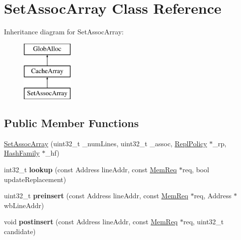 \hypertarget{classSetAssocArray}{\section{Set\-Assoc\-Array Class Reference}
\label{classSetAssocArray}
}
Inheritance diagram for Set\-Assoc\-Array\-:\begin{figure}[H]
\begin{center}
\leavevmode
\includegraphics[height=3.000000cm]{classSetAssocArray}
\end{center}
\end{figure}
\subsection*{Public Member Functions}
\begin{DoxyCompactItemize}
\item 
\hyperlink{classSetAssocArray_ae940b9d5ab4c189c406c01afe01e0186}{Set\-Assoc\-Array} (uint32\-\_\-t \-\_\-num\-Lines, uint32\-\_\-t \-\_\-assoc, \hyperlink{classReplPolicy}{Repl\-Policy} $\ast$\-\_\-rp, \hyperlink{classHashFamily}{Hash\-Family} $\ast$\-\_\-hf)
\item 
\hypertarget{classSetAssocArray_a6aa053ebaf8dce25ed36c3b8d9313655}{int32\-\_\-t {\bfseries lookup} (const Address line\-Addr, const \hyperlink{structMemReq}{Mem\-Req} $\ast$req, bool update\-Replacement)}\label{classSetAssocArray_a6aa053ebaf8dce25ed36c3b8d9313655}

\item 
\hypertarget{classSetAssocArray_ae19bd9b3076226a8a69bdcc4fc7f5bcb}{uint32\-\_\-t {\bfseries preinsert} (const Address line\-Addr, const \hyperlink{structMemReq}{Mem\-Req} $\ast$req, Address $\ast$wb\-Line\-Addr)}\label{classSetAssocArray_ae19bd9b3076226a8a69bdcc4fc7f5bcb}

\item 
\hypertarget{classSetAssocArray_a77e44df257b97ef7c9ed641cb6661109}{void {\bfseries postinsert} (const Address line\-Addr, const \hyperlink{structMemReq}{Mem\-Req} $\ast$req, uint32\-\_\-t candidate)}\label{classSetAssocArray_a77e44df257b97ef7c9ed641cb6661109}

\end{DoxyCompactItemize}
